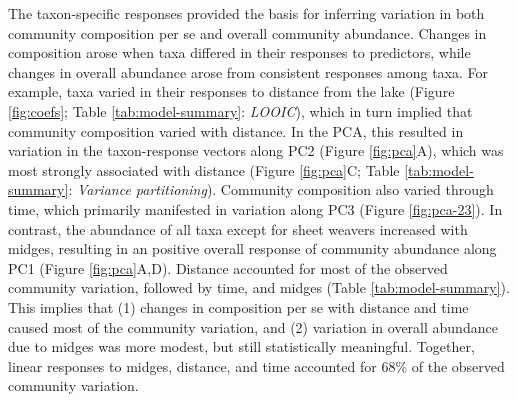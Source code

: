 The taxon-specific responses provided the basis for inferring variation 
in both community composition per se and overall community abundance.
Changes in composition arose when taxa differed in their responses
to predictors, while changes in overall abundance arose from consistent
responses among taxa.
For example, taxa varied in their responses to distance from the lake 
(Figure \ref{fig:coefs}; Table \ref{tab:model-summary}: \emph{LOOIC}),
which in turn implied that community composition varied with distance.
In the PCA, this resulted in variation in the taxon-response vectors
along PC2 (Figure \ref{fig:pca}A), 
which was most strongly associated with distance 
(Figure \ref{fig:pca}C; Table \ref{tab:model-summary}: \emph{Variance partitioning}).
Community composition also varied through time, 
which primarily manifested in variation along PC3 (Figure \ref{fig:pca-23}).
In contrast, the abundance of all taxa except for sheet weavers increased with midges,
resulting in an positive overall response of community abundance along PC1 (Figure \ref{fig:pca}A,D).
Distance accounted for most of the observed community variation,
followed by time, and midges (Table \ref{tab:model-summary}). 
This implies that (1) changes in composition per se
with distance and time caused most of the community variation, and 
(2) variation in overall abundance due to midges was more modest,
but still statistically meaningful.
Together, linear responses to midges, distance, and time accounted for 
68\% of the observed community variation.
